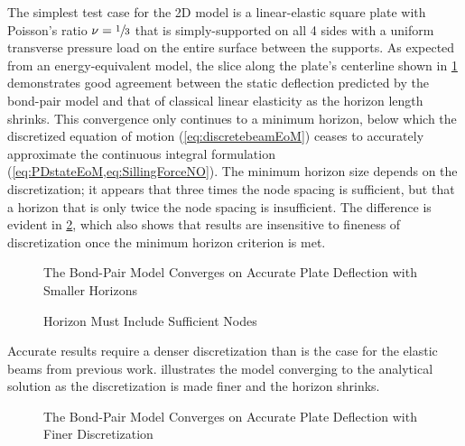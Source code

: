 The simplest test case for the 2D model is a linear-elastic square plate with Poisson's ratio \(\nu = \sfrac{1}{3}\) that is simply-supported on all 4 sides with a uniform transverse pressure load on the entire surface between the supports.  As expected from an energy-equivalent model, the slice along the plate's centerline shown in \cref{fig:plate_convergence_h} demonstrates good agreement between the static deflection predicted by the bond-pair model and that of classical linear elasticity as the horizon length shrinks.  This convergence only continues to a minimum horizon, below which the discretized equation of motion (\cref{eq:discretebeamEoM}) ceases to accurately approximate the continuous integral formulation (\cref{eq:PDstateEoM,eq:SillingForceNO}).  The minimum horizon size depends on the discretization; it appears that three times the node spacing is sufficient, but that a horizon that is only twice the node spacing is insufficient.  The difference is evident in \cref{fig:plate_minimum_h}, which also shows that results are insensitive to fineness of discretization once the minimum horizon criterion is met.
%
\begin{figure}[h]
  \centering
  \resizebox{0.6\linewidth}{!}{}
  \caption{The Bond-Pair Model Converges on Accurate Plate Deflection with Smaller Horizons}
  \label{fig:plate_convergence_h}
\end{figure}
%
\begin{figure}[h]
  \centering
  \resizebox{0.6\linewidth}{!}{}
  \caption{Horizon Must Include Sufficient Nodes}
  \label{fig:plate_minimum_h}
\end{figure}
%
Accurate results require a denser discretization than is the case for the elastic beams from previous work.   illustrates the model converging to the analytical solution as the discretization is made finer and the horizon shrinks.
%
\begin{figure}[tbp]
  \centering
  \resizebox{0.6\linewidth}{!}{}
  \caption{The Bond-Pair Model Converges on Accurate Plate Deflection with Finer Discretization}
  \label{fig:plate_convergence_n}
\end{figure}

